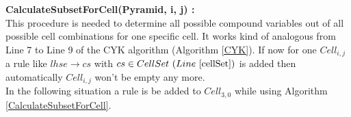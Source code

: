 \noindent \textbf{CalculateSubsetForCell(Pyramid, i, j) :}\\
This procedure is needed to determine all possible compound variables out of all possible cell combinations for one specific cell. It works kind of analogous from Line 7 to Line 9 of the CYK algorithm (Algorithm \ref{CYK}). If now for one $Cell_{i,j}$ a rule like $lhse \rightarrow cs$ with $cs \in CellSet~(Line~\ref{cellSet})$ is added then automatically $Cell_{i,j}$ won't be empty any more.\\

\noindent {}
In the following situation a rule is be added to $Cell_{3,0}$ while using Algorithm \ref{CalculateSubsetForCell}.
\noindent
